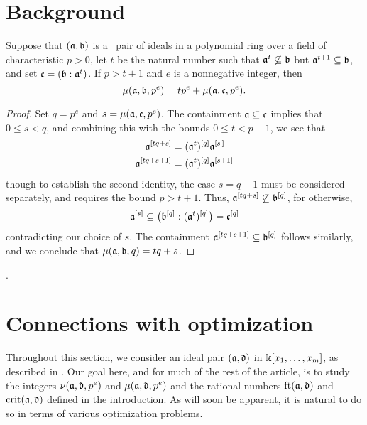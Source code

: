 \documentclass{amsart}
\begin{document}
\section{Background}
\label{background: S}

\begin{lemma} 
\label{compatible to small compatible: L}
 Suppose that $(\mathfrak{a}, \mathfrak{b})$ is a \compatible\ pair of ideals in a polynomial ring over a field of characteristic $p>0$, let $t$ be the natural number such that $\mathfrak{a}^t \not \subseteq \mathfrak{b}$ but $\mathfrak{a}^{t+1} \subseteq \mathfrak{b}$, and set $\mathfrak{c} = (\mathfrak{b} : \mathfrak{a}^t)$.   If $p > t+1$ and $e$ is a nonnegative integer, then
\[ \mu(\mathfrak{a}, \mathfrak{b}, p^e) = t p^e + \mu(\mathfrak{a}, \mathfrak{c}, p^e). \] 
\end{lemma}

\begin{proof}  Set $q=p^e$ and $s=\mu(\mathfrak{a}, \mathfrak{c}, p^e)$.  The containment $\mathfrak{a} \subseteq \mathfrak{c}$ implies that $0 \leq s < q$, and combining this with the bounds $0 \le t < p-1$, we see that 
%
\begin{align*}
\mathfrak{a}^{[tq+s]} & = (\mathfrak{a}^t)^{[q]} \mathfrak{a}^{[s \, ]} \\ 
 \mathfrak{a}^{[tq+s+1]} & = (\mathfrak{a}^t)^{[q]} \mathfrak{a}^{[s+1]}
\end{align*}
%
though to establish the second identity, the case $s=q-1$ must be considered separately, and requires the bound $p>t+1$.  Thus, $\mathfrak{a}^{[tq+s]} \not \subseteq \mathfrak{b}^{[q]}$, for otherwise, \[ \mathfrak{a}^{[s]} \subseteq \big(\mathfrak{b}^{[q]} : (\mathfrak{a}^t)^{[q]}\big) = \mathfrak{c}^{[q]}\]  contradicting our choice of $s$.  The containment $\mathfrak{a}^{[tq+s+1]} \subseteq \mathfrak{b}^{[q]}$ follows similarly, and we conclude that $\mu(\mathfrak{a},\mathfrak{b},q) = tq + s$. 
\end{proof}.


\section{Connections with optimization}
\label{sec: LPs}

Throughout this section, we consider an ideal pair $(\mathfrak{a}, \mathfrak{d})$ in $\Bbbk[x_1, \ldots, x_{m}]$, as described in .
Our goal here, and for much of the rest of the article, is to study the integers $\nu(\mathfrak{a}, \mathfrak{d}, p^e)$ and $\mu(\mathfrak{a}, \mathfrak{d}, p^e)$ and the rational numbers $\operatorname{ft}(\mathfrak{a}, \mathfrak{d})$ and $\operatorname{crit}(\mathfrak{a}, \mathfrak{d})$ defined in the introduction.
As will soon be apparent, it is natural to do so in terms of various optimization problems.
\end{document}
